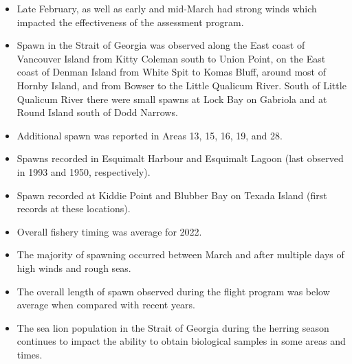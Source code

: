 \begin{itemize}

\item Late February, as well as early and mid-March had strong winds
which impacted the effectiveness of the assessment program.

\item Spawn in the Strait of Georgia was observed
along the East coast of Vancouver Island from Kitty Coleman south to Union Point,
on the East coast of Denman Island from White Spit to Komas Bluff,
around most of Hornby Island,
and from Bowser to the Little Qualicum River.
South of Little Qualicum River there were small spawns
at Lock Bay on Gabriola and at Round Island south of Dodd Narrows. 

\item Additional spawn was reported in Areas 13, 15, 16, 19, and 28.

\item Spawns recorded in Esquimalt Harbour and Esquimalt Lagoon
(last observed in 1993 and 1950, respectively).

\item Spawn recorded at Kiddie Point and Blubber Bay
on Texada Island (first records at these locations).

\item Overall fishery timing was average for 2022.

\item The majority of spawning occurred between March  and 
after multiple days of high winds and rough seas.

\item The overall length of spawn observed during the flight program
was below average when compared with recent years.

\item The sea lion population in the Strait of Georgia during the herring season
continues to impact the ability to obtain biological samples in some areas and times.

\end{itemize}